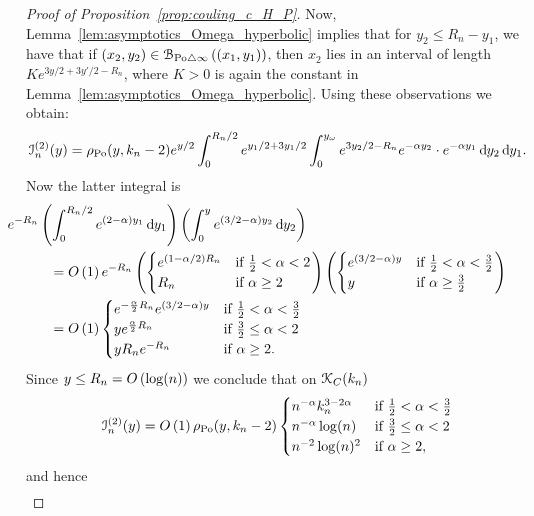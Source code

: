 \begin{proof}[Proof of Proposition~\ref{prop:couling_c_H_P}]
Now, Lemma~\ref{lem:asymptotics_Omega_hyperbolic} implies that for 
$y_2 \leq R_n -y_1$, we have that if 
$(x_2,y_2) \in {\mathcal B}_{{\mathrm{Po}} \bigtriangleup \infty}\left((x_1,y_1)\right)$, then $x_2$ lies in an interval of length 
$Ke^{3 y/2 + 3y'/2 - R_n}$, where $K >0$ is again the constant in Lemma~\ref{lem:asymptotics_Omega_hyperbolic}. 
Using these observations we obtain: 
\begin{equation} \label{eq:term2_intermediate}
	\mathcal{I}_n^{(2)}(y) = \rho_{{\mathrm{Po}}}(y,k_n-2) e^{y/2}\int_0^{R_n/2} e^{y_1/2 + 3y_1/2}
	\int_0^{y_\omega} e^{3y_2/2 - R_n} e^{-\alpha y_2} \cdot e^{-\alpha y_1} \operatorname{\mathrm{d}\hspace{-2pt}} y_2 \operatorname{\mathrm{d}\hspace{-2pt}} y_1. 
\end{equation} 
Now the latter integral is
\begin{align*}
	&\hspace{-30pt} e^{-R_n}  \left(\int_0^{R_n/2} e^{(2-\alpha )y_1} \dd y_1\right) 
		\left( \int_0^{y} e^{(3/2 - \alpha) y_2} \dd y_2 \right)\\
	&= \bigO{1} e^{-R_n} \left(\begin{cases}
		e^{(1-\alpha/2)R_n} &\mbox{if } \frac{1}{2} < \alpha < 2\\
		R_n &\mbox{if } \alpha \ge 2
	\end{cases}\right)
	\left(\begin{cases}
		e^{(3/2 - \alpha)y} &\mbox{if } \frac{1}{2} < \alpha < \frac{3}{2}\\
		y &\mbox{if } \alpha \ge \frac{3}{2}
	\end{cases}\right)\\
	&= \bigO{1} \begin{cases}
		e^{-\frac{\alpha}{2}R_n} e^{(3/2 - \alpha)y} &\mbox{if } \frac{1}{2} < \alpha < \frac{3}{2}\\
		y e^{\frac{\alpha}{2} R_n} &\mbox{if } \frac{3}{2} \le \alpha < 2\\
		y R_n e^{-R_n} &\mbox{if } \alpha \ge 2.
	\end{cases} 
\end{align*}
Since $y \le R_n = O\left(\log(n)\right)$ we conclude that on ${\mathcal K}_{C}(k_n)$
\[
	\mathcal{I}_n^{(2)}(y) = O\left(1\right) \rho_{{\mathrm{Po}}}(y,k_n-2) \begin{cases}
				n^{-\alpha} k_n^{3 - 2\alpha} &\mbox{if } \frac{1}{2} < \alpha < \frac{3}{2}\\
				n^{-\alpha} \log(n) &\mbox{if } \frac{3}{2} \le \alpha < 2\\
				n^{-2} \log(n)^{2} &\mbox{if } \alpha \ge 2,
		\end{cases}	
\]
and hence
\begin{align*}

\end{align*}
\end{proof}
